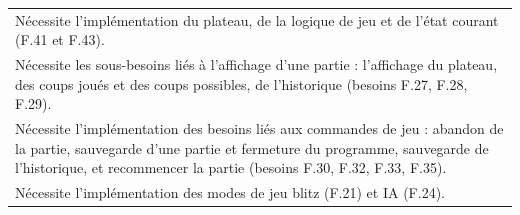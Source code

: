 \documentclass[a4paper,12pt]{article}
\begin{document}
\begin{tabularx}{\textwidth}{|X|}
    \arrayrulecolor{MediumAquamarine}\hline
    \arrayrulecolor{CornflowerBlue}
    Nécessite l’implémentation du plateau, de la logique de jeu et de l’état courant (F.41 et F.43).                                                                                                                                                                                                                                                                                                                                                                                                                                                                                                                            \\
    Nécessite les sous-besoins liés à l’affichage d’une partie : l’affichage du plateau, des coups joués et des coups possibles, de l’historique (besoins F.27, F.28, F.29).                                                                                                                                                                                                                                                                                                                                                                                                                                                    \\
    Nécessite l'implémentation des besoins liés aux commandes de jeu : abandon de la partie, sauvegarde d’une partie et fermeture du programme, sauvegarde de l’historique, et recommencer la partie (besoins F.30, F.32, F.33, F.35).                                                                                                                                                                                                                                                                                                                                                                                          \\
    Nécessite l’implémentation des modes de jeu blitz (F.21) et IA (F.24).                                                                                                                                                                                                                                                                                                                                                                                                                                                                                                                                                      \\

\end{tabularx}
\end{document}
